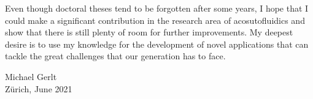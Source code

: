 Even though doctoral theses tend to be forgotten after some years, I hope that 
I could make a significant contribution in the research area of acosutofluidics 
and show that there is still plenty of room for further improvements. My 
deepest desire is to use my knowledge for the development of novel applications 
that can tackle the great challenges that our generation has to face.

\begin{flushleft}
\begin{figure}[h]
\begin{flushleft}
\end{flushleft}
\end{figure}
\vspace{-0.1 cm}
\hspace{1 cm} Michael Gerlt\\
\hspace{1 cm} Zürich, June 2021
\end{flushleft}
